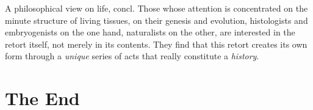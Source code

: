 \begin{frame}{A philosophical view on life, concl.}{}
Those whose attention is concentrated on the minute structure of living tissues, on their genesis and evolution, histologists and embryogenists on the one hand, naturalists on the other, are interested in the retort itself, not merely in its contents. They find that this retort creates its own form through a \emph{unique} series of acts that really constitute a \emph{history}. \quad {}
\end{frame}

\part{The End}
\frame{\partpage}

